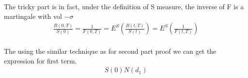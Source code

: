 The tricky part is in fact, under the definition of S measure, the inverse of F is a martingale with vol $-\sigma$
\begin{equation}
\begin{aligned}
\frac{B(0, T)}{S(0)} = \frac{1}{F(0, T)} = E^S(\frac{B(t, T)}{S(t)}) = E^S(\frac{1}{F(t, T)}) \\
\end{aligned}
\end{equation}

The using the similar technique as for second part proof we can get the expression for first term.
\begin{equation}
\begin{aligned}
S(0) N(d_1)
\end{aligned}
\end{equation}
